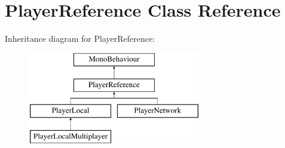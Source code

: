 \hypertarget{class_player_reference}{\section{Player\-Reference Class Reference}
\label{class_player_reference}
}
Inheritance diagram for Player\-Reference\-:\begin{figure}[H]
\begin{center}
\leavevmode
\includegraphics[height=4.000000cm]{class_player_reference}
\end{center}
\end{figure}
